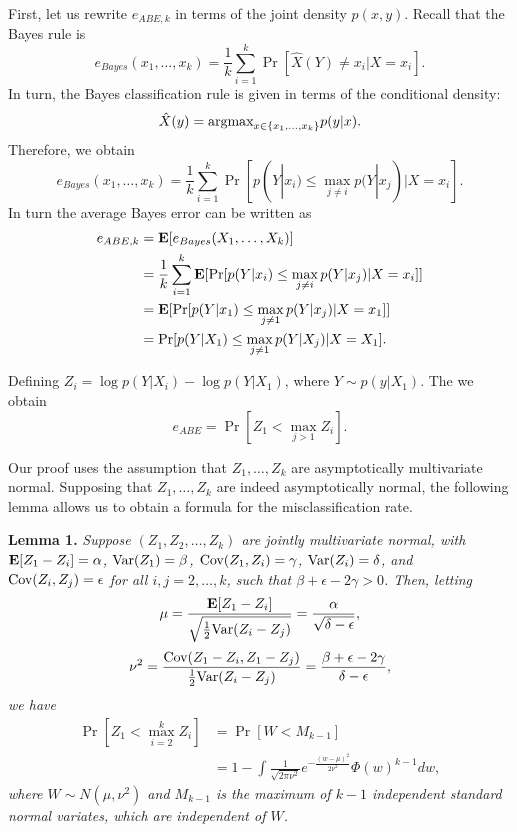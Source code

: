 \documentclass[12pt]{article}
\begin{document}
First, let us rewrite $e_{ABE, k}$ in terms of the joint density $p(x, y)$.  Recall that the Bayes rule is
\[
e_{Bayes}(x_1,\hdots, x_k) = \frac{1}{k}\sum_{i=1}^k \Pr[\hat{X}(Y) \neq x_i| X = x_i].
\]
In turn, the Bayes classification rule is given in terms of the conditional density:
\[
\hat{X}(y) = \text{argmax}_{x \in \{x_1,\hdots, x_k\}} p(y|x).
\]
Therefore, we obtain
\[
e_{Bayes}(x_1,\hdots, x_k) = \frac{1}{k}\sum_{i=1}^k \Pr[p(Y|x_i) \leq \max_{j \neq i} p(Y|x_j)| X = x_i].
\]
In turn the average Bayes error can be written as
\begin{align}
e_{ABE, k} &= \textbf{E}[e_{Bayes}(X_1,\hdots, X_k)]
\\&= \frac{1}{k}\sum_{i=1}^k \textbf{E}[\Pr[p(Y|x_i) \leq \max_{j \neq i} p(Y|x_j)| X = x_i]]
\\&= \textbf{E}[\Pr[p(Y|x_1) \leq \max_{j \neq 1} p(Y|x_j)| X = x_1]]
\\&= \Pr[p(Y|X_1) \leq \max_{j \neq 1} p(Y|X_j)| X = X_1].
\end{align}

Defining $Z_i = \log p(Y|X_i) - \log p(Y|X_1)$, where $Y \sim p(y|X_1)$.
The we obtain
\[
e_{ABE} = \Pr[Z_1 < \max_{j > 1} Z_i].
\]

Our proof uses the assumption that $Z_1,\hdots, Z_k$ are asymptotically multivariate normal.
Supposing that $Z_1,\hdots, Z_k$ are indeed asymptotically normal, the following lemma
allows us to obtain a formula for the misclassification rate.

\textbf{Lemma 1. }
\emph{
Suppose $(Z_1, Z_2, \hdots, Z_k)$ are jointly multivariate normal, with 
$\textbf{E}[Z_1 - Z_i]= \alpha$, 
$\text{Var}(Z_1) = \beta$, 
$\text{Cov}(Z_1, Z_i) = \gamma$, 
$\text{Var}(Z_i)= \delta$, and $\text{Cov}(Z_i, Z_j) = \epsilon$ for all $i, j = 2, \hdots,
k$, such that $\beta + \epsilon - 2\gamma > 0$.  Then, letting
\[
\mu = \frac{\textbf{E}[Z_1 - Z_i]}{\sqrt{\frac{1}{2}\text{Var}(Z_i - Z_j)}} = \frac{\alpha}{\sqrt{\delta - \epsilon}},
\]
\[
\nu^2 = \frac{\text{Cov}(Z_1 -Z_i, Z_1 - Z_j)}{\frac{1}{2}\text{Var}(Z_i - Z_j)} = \frac{\beta + \epsilon - 2\gamma}{\delta - \epsilon},
\]
we have
\begin{align*}
\Pr[Z_1 < \max_{i=2}^k Z_i] &= \Pr[W < M_{k-1}]
\\&= 1 - \int \frac{1}{\sqrt{2\pi\nu^2}} e^{-\frac{(w-\mu)^2}{2\nu^2}} \Phi(w)^{k-1} dw,
\end{align*}
where $W \sim N(\mu, \nu^2)$ and $M_{k-1}$ is the maximum of $k-1$
independent standard normal variates, which are independent of $W$.
}
\end{document}
